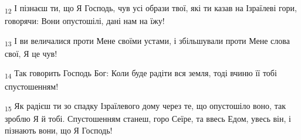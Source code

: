 \begin{tcolorbox}
\textsubscript{12} І пізнаєш ти, що Я Господь, чув усі образи твої, які ти казав на Ізраїлеві гори, говорячи: Вони опустошілі, дані нам на їжу!
\end{tcolorbox}
\begin{tcolorbox}
\textsubscript{13} І ви величалися проти Мене своїми устами, і збільшували проти Мене слова свої, Я це чув!
\end{tcolorbox}
\begin{tcolorbox}
\textsubscript{14} Так говорить Господь Бог: Коли буде радіти вся земля, тоді вчиню її тобі спустошенням!
\end{tcolorbox}
\begin{tcolorbox}
\textsubscript{15} Як радієш ти зо спадку Ізраїлевого дому через те, що опустошіло воно, так зроблю Я й тобі. Спустошенням станеш, горо Сеїре, та ввесь Едом, увесь він, і пізнають вони, що Я Господь!
\end{tcolorbox}
